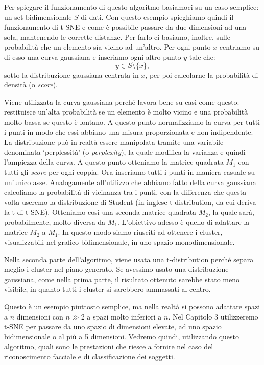 \documentclass[12pt,italian]{report}
\begin{document}
Per spiegare il funzionamento di questo algoritmo basiamoci su un caso semplice: un set bidimensionale $S$ di dati. Con questo esempio spieghiamo quindi il funzionamento di t-SNE e come è possibile passare da due dimensioni ad una sola, mantenendo le corrette distanze. Per farlo ci basiamo, inoltre, sulle probabilità che un elemento sia vicino ad un'altro. Per ogni punto $ x $ centriamo su di esso una curva gaussiana e inseriamo ogni altro punto $ y $  tale che:
\[ y \in S \setminus \{x\}, \]
sotto la distribuzione gaussiana centrata in $ x $, per poi calcolarne la probabilità di densità (o \emph{score}).

Viene utilizzata la curva gaussiana perché lavora bene su casi come questo: restituisce un'alta probabilità se un elemento è molto vicino e una probabilità molto bassa se questo è lontano. A questo punto normalizziamo la curva per tutti i punti in modo che essi abbiano una misura proporzionata e non indipendente. La distribuzione può in realtà essere manipolata tramite una variabile denominata `perplessità' (o \emph{perplexity}), la quale modifica la varianza e quindi l'ampiezza della curva.
A questo punto otteniamo la matrice quadrata $ M_{1} $ con tutti gli \emph{score} per ogni coppia. Ora inseriamo tutti i punti in maniera casuale su un'unico asse. Analogamente all'utilizzo che abbiamo fatto della curva gaussiana calcoliamo la probabilità di vicinanza tra i punti, con la differenza che questa volta useremo la distribuzione di Student (in inglese t-distribution, da cui deriva la t di t-SNE). Otteniamo così una seconda matrice quadrata $ M_{2} $, la quale sarà, probabilmente, molto diversa da $ M_{1} $. L'obiettivo adesso è quello di adattare la matrice $ M_{2} $ a $ M_{1} $. In questo modo siamo riusciti ad ottenere i cluster, visualizzabili nel grafico bidimensionale, in uno spazio monodimensionale.

Nella seconda parte dell'algoritmo, viene usata una t-distribution perché separa meglio i cluster nel piano generato. Se avessimo usato una distribuzione gaussiana, come nella prima parte, il risultato ottenuto sarebbe stato meno visibile, in quanto tutti i cluster si sarebbero ammassati al centro.

Questo è un esempio piuttosto semplice, ma nella realtà si possono adattare spazi a $n$ dimensioni con $ n \gg 2 $ a spazi molto inferiori a $n$. Nel Capitolo 3 utilizzeremo t-SNE per passare da uno spazio di dimensioni elevate, ad uno spazio bidimensionale o al più a 5 dimensioni. Vedremo quindi, utilizzando questo algoritmo, quali sono le prestazioni che riesce a fornire nel caso del riconoscimento facciale e di classificazione dei soggetti.
% 
% 
\end{document}
